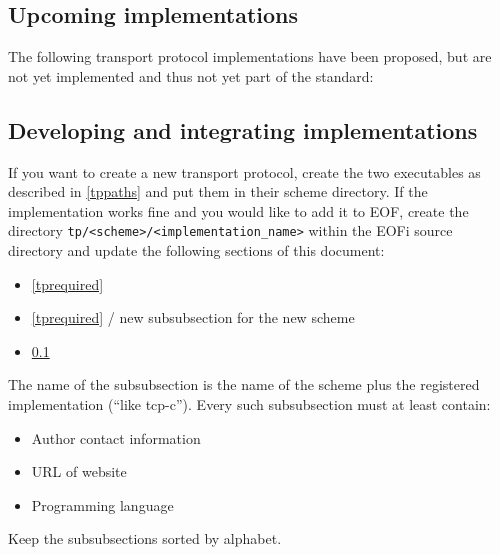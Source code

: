 \subsection{Upcoming implementations}
\label{tpupcoming}
The following transport protocol implementations have been proposed,
but are not yet implemented and thus not yet part of the standard:

\subsection{Developing and integrating implementations}
If you want to create a new transport protocol, create the two
executables as described in \ref{tppaths} and put them in their
scheme directory.
If the implementation works fine and you would like to add it to EOF,
create the directory \verb=tp/<scheme>/<implementation_name>= within
the EOFi source directory and update the following
sections of this document:
\begin{itemize}
\item \ref{tprequired}
\item \ref{tprequired} / new subsubsection for the new scheme
\item \ref{tpupcoming}
\end{itemize}

The name of the subsubsection is the name of the scheme
plus the registered implementation ("`like tcp-c"').
Every such subsubsection must at least contain:
\begin{itemize}
\item Author contact information
\item URL of website
\item Programming language
\end{itemize}
Keep the subsubsections sorted by alphabet.

